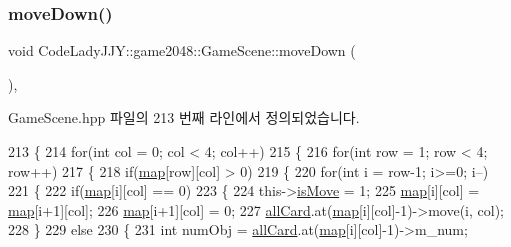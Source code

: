 \subsubsection{\texorpdfstring{move\+Down()}{moveDown()}}
{\footnotesize\ttfamily void Code\+Lady\+J\+J\+Y\+::game2048\+::\+Game\+Scene\+::move\+Down (\begin{DoxyParamCaption}{ }\end{DoxyParamCaption})\hspace{0.3cm}{\ttfamily [inline]}, {\ttfamily [private]}}



Game\+Scene.\+hpp 파일의 213 번째 라인에서 정의되었습니다.


\begin{DoxyCode}
213                    \{
214     \textcolor{keywordflow}{for}(\textcolor{keywordtype}{int} col = 0; col < 4; col++)
215     \{
216         \textcolor{keywordflow}{for}(\textcolor{keywordtype}{int} row = 1; row < 4; row++)
217         \{
218             \textcolor{keywordflow}{if}(\hyperlink{class_code_lady_j_j_y_1_1game2048_1_1_game_scene_a4d8924d645182d1e2f6b44390e4101ea}{map}[row][col] > 0)
219             \{
220                 \textcolor{keywordflow}{for}(\textcolor{keywordtype}{int} i = row-1; i>=0; i--)
221                 \{
222                     \textcolor{keywordflow}{if}(\hyperlink{class_code_lady_j_j_y_1_1game2048_1_1_game_scene_a4d8924d645182d1e2f6b44390e4101ea}{map}[i][col] == 0)
223                     \{
224                         this->\hyperlink{class_code_lady_j_j_y_1_1game2048_1_1_game_scene_a72716d8ae260804ce013766cf4ad1505}{isMove} = 1;
225                         \hyperlink{class_code_lady_j_j_y_1_1game2048_1_1_game_scene_a4d8924d645182d1e2f6b44390e4101ea}{map}[i][col] = \hyperlink{class_code_lady_j_j_y_1_1game2048_1_1_game_scene_a4d8924d645182d1e2f6b44390e4101ea}{map}[i+1][col];
226                         \hyperlink{class_code_lady_j_j_y_1_1game2048_1_1_game_scene_a4d8924d645182d1e2f6b44390e4101ea}{map}[i+1][col] = 0;
227                         \hyperlink{class_code_lady_j_j_y_1_1game2048_1_1_game_scene_aadcd54235c70f1d794213f50f429437f}{allCard}.at(\hyperlink{class_code_lady_j_j_y_1_1game2048_1_1_game_scene_a4d8924d645182d1e2f6b44390e4101ea}{map}[i][col]-1)->move(i, col);
228                     \}
229                     \textcolor{keywordflow}{else}
230                     \{
231                         \textcolor{keywordtype}{int} numObj = \hyperlink{class_code_lady_j_j_y_1_1game2048_1_1_game_scene_aadcd54235c70f1d794213f50f429437f}{allCard}.at(\hyperlink{class_code_lady_j_j_y_1_1game2048_1_1_game_scene_a4d8924d645182d1e2f6b44390e4101ea}{map}[i][col]-1)->m\_num;

\end{DoxyCode}
